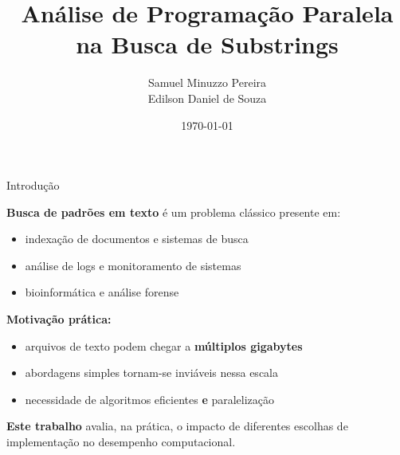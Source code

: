 \documentclass{beamer}
\title{Análise de Programação Paralela\\
na Busca de Substrings}
\author{Samuel Minuzzo Pereira \\ Edilson Daniel de Souza}
\institute{UTFPR}
\date{\today}
\begin{document}
\frame{\titlepage}


\begin{frame}{Introdução}

\textbf{Busca de padrões em texto} é um problema clássico presente em:

\begin{itemize}
    \item indexação de documentos e sistemas de busca
    \item análise de logs e monitoramento de sistemas
    \item bioinformática e análise forense
\end{itemize}

\vspace{0.4cm}

\textbf{Motivação prática:}
\begin{itemize}
    \item arquivos de texto podem chegar a \textbf{múltiplos gigabytes}
    \item abordagens simples tornam-se inviáveis nessa escala
    \item necessidade de algoritmos eficientes \textbf{e} paralelização
\end{itemize}

\vspace{0.4cm}

\textbf{Este trabalho} avalia, na prática, o impacto de diferentes
escolhas de implementação no desempenho computacional.

\end{frame}
\end{document}
